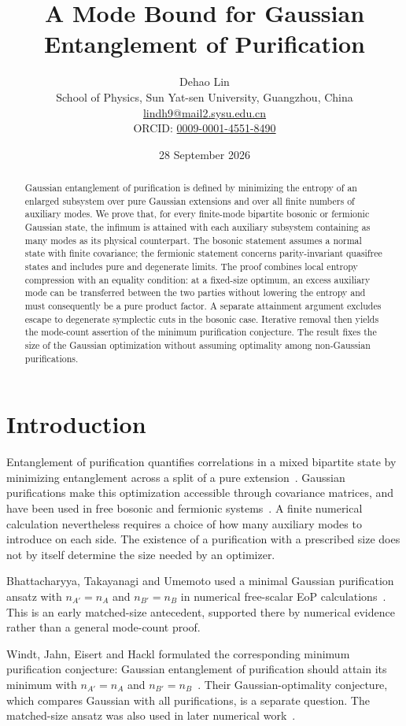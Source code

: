 \documentclass[11pt,a4paper]{article}
\title{\bfseries A Mode Bound for Gaussian\\Entanglement of Purification}
\author{Dehao Lin\\[3pt]
\small School of Physics, Sun Yat-sen University, Guangzhou, China\\
\small\href{mailto:lindh9@mail2.sysu.edu.cn}{lindh9@mail2.sysu.edu.cn}\\
\small ORCID: \href{https://orcid.org/0009-0001-4551-8490}{0009-0001-4551-8490}}
\date{28 September 2026}
\numberwithin{equation}{section}
\theoremstyle{remark}
\begin{document}
\maketitle
\begin{abstract}
Gaussian entanglement of purification is defined by minimizing the entropy of an enlarged subsystem over pure Gaussian extensions and over all finite numbers of auxiliary modes. We prove that, for every finite-mode bipartite bosonic or fermionic Gaussian state, the infimum is attained with each auxiliary subsystem containing as many modes as its physical counterpart. The bosonic statement assumes a normal state with finite covariance; the fermionic statement concerns parity-invariant quasifree states and includes pure and degenerate limits. The proof combines local entropy compression with an equality condition: at a fixed-size optimum, an excess auxiliary mode can be transferred between the two parties without lowering the entropy and must consequently be a pure product factor. A separate attainment argument excludes escape to degenerate symplectic cuts in the bosonic case. Iterative removal then yields the mode-count assertion of the minimum purification conjecture. The result fixes the size of the Gaussian optimization without assuming optimality among non-Gaussian purifications.
\end{abstract}

\section{Introduction}
Entanglement of purification quantifies correlations in a mixed bipartite state by minimizing entanglement across a split of a pure extension~\cite{Terhal2002}. Gaussian purifications make this optimization accessible through covariance matrices, and have been used in free bosonic and fermionic systems~\cite{Bhattacharyya2018,Bhattacharyya2019,Camargo2021}. A finite numerical calculation nevertheless requires a choice of how many auxiliary modes to introduce on each side. The existence of a purification with a prescribed size does not by itself determine the size needed by an optimizer.

Bhattacharyya, Takayanagi and Umemoto used a minimal Gaussian purification ansatz with $n_{A'}=n_A$ and $n_{B'}=n_B$ in numerical free-scalar EoP calculations~\cite[Sec.~3.5]{Bhattacharyya2018}. This is an early matched-size antecedent, supported there by numerical evidence rather than a general mode-count proof.

Windt, Jahn, Eisert and Hackl formulated the corresponding minimum purification conjecture: Gaussian entanglement of purification should attain its minimum with $n_{A'}=n_A$ and $n_{B'}=n_B$~\cite[Sec.~6.1, Conjecture~2]{Windt2021}. Their Gaussian-optimality conjecture, which compares Gaussian with all purifications, is a separate question. The matched-size ansatz was also used in later numerical work~\cite[Sec.~5.1]{Chen2025}.
\end{document}
